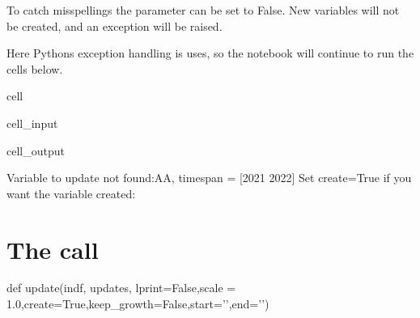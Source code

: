 \documentclass[letterpaper,10pt,english]{jupyterBook}
\begin{document}
\sphinxAtStartPar
To catch misspellings the parameter  can be set to False.
New variables will not be created, and an exception will be raised.

\sphinxAtStartPar
Here Pythons exception handling is uses, so the notebook will continue to run the cells below.

\begin{sphinxuseclass}{cell}\begin{sphinxVerbatimInput}

\begin{sphinxuseclass}{cell_input}
\begin{sphinxVerbatim}[commandchars=\\\{\}]
      
   
      
\end{sphinxVerbatim}

\end{sphinxuseclass}\end{sphinxVerbatimInput}
\begin{sphinxVerbatimOutput}

\begin{sphinxuseclass}{cell_output}
\begin{sphinxVerbatim}[commandchars=\\\{\}]
Variable to update not found:AA, timespan = [2021 2022] 
Set create=True if you want the variable created: 
\end{sphinxVerbatim}

\end{sphinxuseclass}\end{sphinxVerbatimOutput}

\end{sphinxuseclass}

\section{The call}
\label{\detokenize{content/howto/update/model update:the-call}}
\sphinxAtStartPar
def update(indf, updates, lprint=False,scale = 1.0,create=True,keep\_growth=False,start=’’,end=’’)
\end{document}
